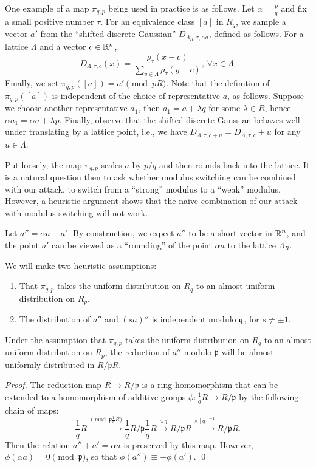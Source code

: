 \documentclass[envcountsame]{llncs}
\begin{document}
One example of a map $\pi_{q,p}$ being used in practice is as follows. Let $\alpha = \frac{p}{q}$ and fix a small positive number $\tau$. For an equivalence class $[a]$ in $R_q$, we sample a vector $a'$ from the ``shifted discrete Gaussian'' $D_{\Lambda_R, \tau, \alpha a}$,  defined as follows. For a lattice $\Lambda$ and a vector $c \in \mathbb{R}^n$,
\[
    D_{\Lambda, \tau, c}(x) = \frac{\rho_\tau(x - c)}{\sum_{y \in\Lambda} \rho_\tau(y-c)}, \, \forall x \in \Lambda.
\]
Finally, we set $ \pi_{q,p}([a]) = a' \pmod{pR}$. Note that the definition of $\pi_{q,p}([a])$ is independent of the choice of  representative $a$, as follows.  Suppose we choose another representative $a_1$, then $a_1 = a+ \lambda q$ for some $\lambda \in R$, hence $\alpha a_1 = \alpha a + \lambda p$.  Finally, observe that the shifted discrete Gaussian behaves well under translating by a lattice point, i.e., we have $D_{\Lambda, \tau, c+u} = D_{\Lambda, \tau, c} + u$ for any $u \in \Lambda$.

Put loosely, the map $\pi_{q,p}$ scales $a$ by $p/q$ and then rounds back into the lattice.  It is a natural question then to ask whether modulus switching can be combined with our attack, to switch from a ``strong'' modulus to a ``weak'' modulus.  However, a heuristic argument shows that the naive combination of our attack with modulus switching will not work.

Let $a'' = \alpha a - a'$. By construction, we expect $a''$ to be a  short vector in $\mathbb{R}^n$, and the point $a'$ can be viewed as a ``rounding'' of the point $\alpha a$ to the lattice $\Lambda_R$.

We will make two heuristic assumptions:

\begin{enumerate}
        \item That $\pi_{q,p}$ takes the uniform distribution on $R_q$ to an almost uniform distribution on $R_p$.
        \item The distribution of $a''$ and $(sa)''$ is independent modulo $\mathfrak{q}$, for $s \neq \pm 1$.
\end{enumerate}

\begin{proposition}
        Under the assumption that $\pi_{q,p}$ takes the uniform distribution on $R_q$ to an almost uniform distribution on $R_p$, the reduction of $a''$ modulo $\mathfrak{p}$ will be almost uniformly distributed in $R/\mathfrak{p}R$.
\end{proposition}

\begin{proof}
The reduction map $R \rightarrow R/\mathfrak{p}$
is a ring homomorphism that can be extended to a homomorphism of additive groups $\phi: \frac{1}{q} R \rightarrow R/\mathfrak{p}$ by the following chain of maps:
\[
        \frac{1}{q} R \xrightarrow{\pmod{\mathfrak{p}\frac{1}{q}R}} \frac{1}{q}R \Big/ \mathfrak{p}\frac{1}{q}R \xrightarrow{ \times q} R/\mathfrak{p}R \xrightarrow{ \times [q]^{-1}} R/\mathfrak{p}R.
\]
Then the relation $a'' + a' = \alpha a$ is preserved by this map.  However, $\phi(\alpha a) = 0 \pmod{\mathfrak{p}}$, so that $\phi(a'') \equiv -\phi(a')$. \qed
\end{proof}
\end{document}

